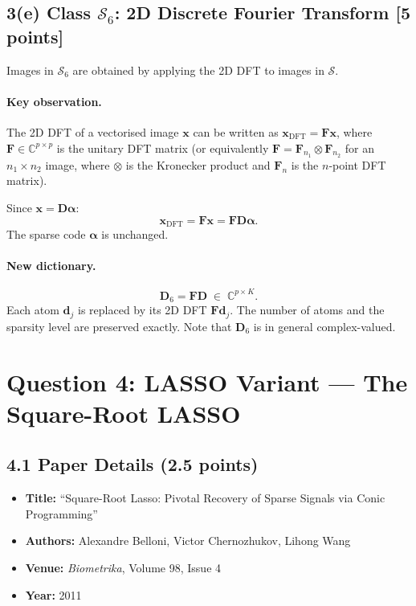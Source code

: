 \documentclass[11pt]{article}
\begin{document}
\subsection*{3(e) Class $\mathcal{S}_6$: 2D Discrete Fourier Transform [5 points]}

Images in $\mathcal{S}_6$ are obtained by applying the 2D DFT to images in $\mathcal{S}$.

\paragraph{Key observation.}
The 2D DFT of a vectorised image $\boldsymbol{x}$ can be written as
$\boldsymbol{x}_{\text{DFT}} = \boldsymbol{F}\boldsymbol{x}$,
where $\boldsymbol{F} \in \mathbb{C}^{p \times p}$ is the unitary DFT matrix
(or equivalently $\boldsymbol{F} = \boldsymbol{F}_{n_1} \otimes \boldsymbol{F}_{n_2}$
for an $n_1 \times n_2$ image, where $\otimes$ is the Kronecker product and
$\boldsymbol{F}_{n}$ is the $n$-point DFT matrix).

Since $\boldsymbol{x} = \boldsymbol{D}\boldsymbol{\alpha}$:
\[
\boldsymbol{x}_{\text{DFT}} = \boldsymbol{F}\boldsymbol{x} = \boldsymbol{F}\boldsymbol{D}\boldsymbol{\alpha}.
\]
The sparse code $\boldsymbol{\alpha}$ is unchanged.

\paragraph{New dictionary.}
\[
\boxed{\boldsymbol{D}_6 = \boldsymbol{F}\boldsymbol{D} \;\in\;\mathbb{C}^{p \times K}.}
\]
Each atom $\boldsymbol{d}_j$ is replaced by its 2D DFT $\boldsymbol{F}\boldsymbol{d}_j$.
The number of atoms and the sparsity level are preserved exactly.
Note that $\boldsymbol{D}_6$ is in general complex-valued.

\newpage
\section*{Question 4: LASSO Variant --- The Square-Root LASSO}

\subsection*{4.1 Paper Details (2.5 points)}
\begin{itemize}
    \item \textbf{Title:} ``Square-Root Lasso: Pivotal Recovery of Sparse Signals via Conic Programming''
    \item \textbf{Authors:} Alexandre Belloni, Victor Chernozhukov, Lihong Wang
    \item \textbf{Venue:} \emph{Biometrika}, Volume 98, Issue 4
    \item \textbf{Year:} 2011
\end{itemize}
\end{document}
